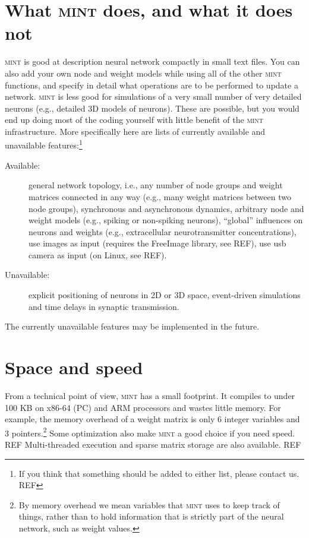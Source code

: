\documentclass[11pt,letterpaper]{memoir}
\newcommand{\mint}{{\scshape\sffamily mint}\xspace}
\begin{document}
\section{What \mint does, and what it does not}
\label{sec:what-mint-does}

\mint is good at description neural network compactly in small text
files. You can also add your own node and weight models while using
all of the other \mint functions, and specify in detail what
operations are to be performed to update a network.  \mint is less
good for simulations of a very small number of very detailed neurons
(e.g., detailed 3D models of neurons). These are possible, but you
would end up doing most of the coding yourself with little benefit of
the \mint infrastructure.  More specifically here are lists of
currently available and unavailable features:\footnote{If you think
  that something should be added to either list, please contact
  us. REF}
\begin{description}
\item[Available:] general network topology, i.e., any number of node
  groups and weight matrices connected in any way (e.g., many weight
  matrices between two node groups), synchronous and asynchronous
  dynamics, arbitrary node and weight models (e.g., spiking or
  non-spiking neurons), ``global'' influences on neurons and weights
  (e.g., extracellular neurotransmitter concentrations), use images as
  input (requires the FreeImage library, see REF), use usb camera as
  input (on Linux, see REF).
\item[Unavailable:] explicit positioning of neurons in 2D or 3D space,
  event-driven simulations and time delays in synaptic transmission.
\end{description}
The currently unavailable features may be implemented in the future.

\section{Space and speed}

From a technical point of view, \mint has a small footprint. It
compiles to under 100 KB on x86-64 (PC) and ARM processors and wastes
little memory. For example, the memory overhead of a weight matrix is
only 6 integer variables and 3 pointers.\footnote{By memory overhead
  we mean variables that \mint uses to keep track of things, rather
  than to hold information that is strictly part of the neural
  network, such as weight values.}  Some optimization also make \mint
a good choice if you need speed. REF Multi-threaded execution and
sparse matrix storage are also available. REF
\end{document}
